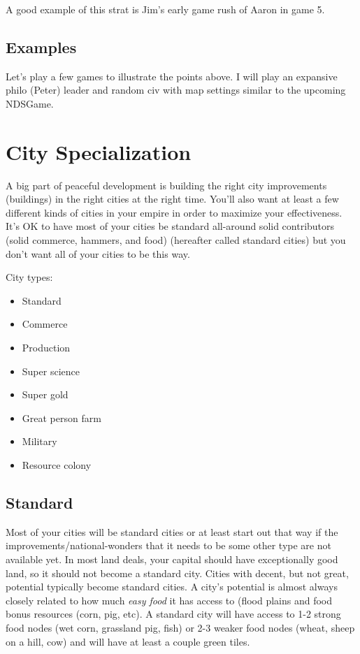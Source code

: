\documentclass[10pt]{article}
\begin{document}
A good example of this strat is Jim's early game rush of Aaron in game 5.

\subsection*{Examples}

Let's play a few games to illustrate the points above. I will play an
expansive philo (Peter) leader and random civ with map settings similar to
the upcoming NDSGame.





\section*{City Specialization}

A big part of peaceful development is building the right city improvements (buildings)
in the right cities at the right time. You'll also want at least a few different
kinds of cities in your empire in order to maximize your effectiveness. It's OK
to have most of your cities be standard all-around solid contributors (solid commerce,
hammers, and food) (hereafter called standard cities) but you don't want all of
your cities to be this way.

City types:
\begin{itemize}
\item Standard
\item Commerce
\item Production
\item Super science
\item Super gold
\item Great person farm
\item Military
\item Resource colony
\end{itemize}

\subsection*{Standard}

Most of your cities will be standard cities or at least start out that
way if the improvements/national-wonders that it needs to be some other type
are not available yet. In most land deals, your capital should have exceptionally
good land, so it should not become a standard city. Cities with decent, but not
great, potential typically become standard cities. A city's potential is almost
always closely related to how much \emph{easy food} it has access to (flood plains
and food bonus resources (corn, pig, etc). A standard city will have access to
1-2 strong food nodes (wet corn, grassland pig, fish) or 2-3 weaker food nodes
(wheat, sheep on a hill, cow) and will have at least a couple green tiles.
\end{document}
